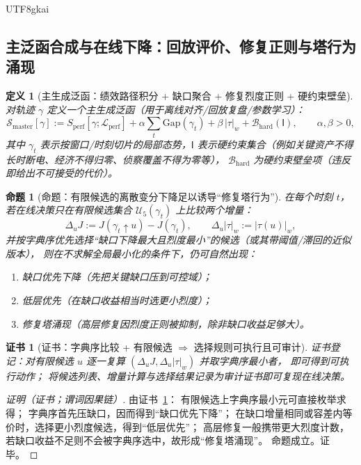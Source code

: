 \documentclass[12pt]{article}
\newtheorem{definition}{定义}[section]
\newtheorem{proposition}{命题}[section]
\newtheorem{Certificate}{证书}[section]
\begin{document}
\begin{CJK*}{UTF8}{gkai}
\subsection{主泛函合成与在线下降：回放评价、修复正则与塔行为涌现}
\label{sec:openra-master-functional-online-descent}

\begin{definition}[主生成泛函：绩效路径积分 + 缺口聚合 + 修复烈度正则 + 硬约束壁垒]
\label{def:openra-master-functional}
对轨迹 $\gamma$ 定义一个主生成泛函（用于离线对齐/回放复盘/参数学习）：
\[
  \mathcal{S}_{\mathrm{master}}[\gamma]
  :=
  S_{\mathrm{perf}}[\gamma;\mathcal{L}_{\mathrm{perf}}]
  +
  \alpha\sum_{t}\mathrm{Gap}(\gamma_t)
  +
  \beta\,|\tau|_w
  +
  \mathcal{B}_{\mathrm{hard}}(\mathsf{I}),
  \qquad
  \alpha,\beta>0,
\]
其中 $\gamma_t$ 表示按窗口/时刻切片的局部态势，$\mathsf{I}$ 表示硬约束集合（例如关键资产不得长时断电、经济不得归零、侦察覆盖不得为零等），
$\mathcal{B}_{\mathrm{hard}}$ 为硬约束壁垒项（违反即给出不可接受的代价）。
\end{definition}

\begin{proposition}[命题：有限候选的离散变分下降足以诱导“修复塔行为”]
\label{prop:openra-online-descent-induces-tower}
在每个时刻 $t$，若在线决策只在有限候选集合 $\mathcal{U}_5(\gamma_t)$ 上比较两个增量：
\[
  \Delta_u J := J(\gamma_t\uparrow u)-J(\gamma_t),
  \qquad
  \Delta_u|\tau|_w := |\tau(u)|_w,
\]
并按字典序优先选择“缺口下降最大且烈度最小”的候选（或其带阈值/滞回的近似版本），
则在不求解全局最小化的条件下，仍可自然出现：
\begin{enumerate}
  \item 缺口优先下降（先把关键缺口压到可控域）；
  \item 低层优先（在缺口收益相当时选更小烈度）；
  \item 修复塔涌现（高层修复因烈度正则被抑制，除非缺口收益足够大）。
\end{enumerate}
\end{proposition}

\begin{Certificate}[证书：字典序比较 + 有限候选 $\Rightarrow$ 选择规则可执行且可审计]
\label{cert:openra-online-descent-induces-tower}
证书登记：对有限候选 $u$ 逐一复算 $(\Delta_u J,\Delta_u|\tau|_w)$ 并取字典序最小者，
即可得到可执行动作；
将候选列表、增量计算与选择结果记录为审计证书即可复现在线决策。
\end{Certificate}

\begin{proof}[证明（证书；谓词因果链）]
由证书~\ref{cert:openra-online-descent-induces-tower}：
有限候选上字典序最小元可直接枚举求得；
字典序首先压缺口，因而得到“缺口优先下降”；
在缺口增量相同或容差内等价时，选择更小烈度候选，得到“低层优先”；
高层修复一般携带更大烈度计数，若缺口收益不足则不会被字典序选中，故形成“修复塔涌现”。
命题成立。证毕。
\end{proof}


\end{CJK*}
\end{document}
